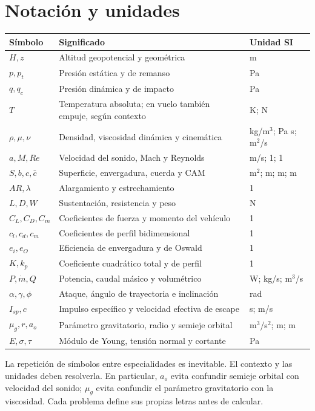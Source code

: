 \chapter{Notación y unidades}\label{ap:notacion}
\begin{longtable}{p{}p{}p{}}
\toprule Símbolo & Significado & Unidad SI \\ \midrule\endhead
$H,z$ & Altitud geopotencial y geométrica & m\\
$p,p_t$ & Presión estática y de remanso & Pa\\
$q,q_c$ & Presión dinámica y de impacto & Pa\\
$T$ & Temperatura absoluta; en vuelo también empuje, según contexto & K; N\\
$\rho,\mu,\nu$ & Densidad, viscosidad dinámica y cinemática & kg/m$^3$; Pa s; m$^2$/s\\
$a,M,Re$ & Velocidad del sonido, Mach y Reynolds & m/s; 1; 1\\
$S,b,c,\bar c$ & Superficie, envergadura, cuerda y CAM & m$^2$; m; m; m\\
$AR,\lambda$ & Alargamiento y estrechamiento & 1\\
$L,D,W$ & Sustentación, resistencia y peso & N\\
$C_L,C_D,C_m$ & Coeficientes de fuerza y momento del vehículo & 1\\
$c_l,c_d,c_m$ & Coeficientes de perfil bidimensional & 1\\
$e_i,e_O$ & Eficiencia de envergadura y de Oswald & 1\\
$K,k_p$ & Coeficiente cuadrático total y de perfil & 1\\
$P,\dot m,Q$ & Potencia, caudal másico y volumétrico & W; kg/s; m$^3$/s\\
$\alpha,\gamma,\phi$ & Ataque, ángulo de trayectoria e inclinación & rad\\
$I_{sp},c$ & Impulso específico y velocidad efectiva de escape & s; m/s\\
$\mu_g,r,a_o$ & Parámetro gravitatorio, radio y semieje orbital & m$^3$/s$^2$; m; m\\
$E,\sigma,\tau$ & Módulo de Young, tensión normal y cortante & Pa\\
\bottomrule
\end{longtable}
La repetición de símbolos entre especialidades es inevitable. El contexto y las unidades deben resolverla. En particular, $a_o$ evita confundir semieje orbital con velocidad del sonido; $\mu_g$ evita confundir el parámetro gravitatorio con la viscosidad. Cada problema define sus propias letras antes de calcular.

